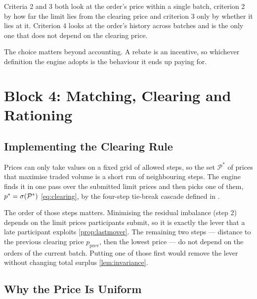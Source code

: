 Criteria 2 and 3 both look at the order's price within a single batch,
criterion 2 by how far the limit lies from the clearing price and
criterion 3 only by whether it lies at it. Criterion 4 looks at the
order's history across batches and is the only one that does not depend
on the clearing price.

The choice matters beyond accounting. A rebate is an incentive, so whichever
definition the engine adopts is the behaviour it ends up paying for.

\section{Block 4: Matching, Clearing and Rationing}
\label{sec:clearing}

\subsection{Implementing the Clearing Rule}

Prices can only take values on a fixed grid of allowed steps, so the set
$\mathcal{P}^{*}$ of prices that maximise traded volume is a short run of
neighbouring steps. The engine finds it in one pass over the submitted
limit prices and then picks one of them, $p^{\ast} = \sigma(\mathcal{P}^{*})$
\eqref{eq:clearing}, by the four-step tie-break cascade defined in
.

The order of those steps matters. Minimising the residual imbalance
(step 2) depends on the limit prices participants submit, so it is
exactly the lever that a late participant exploits \eqref{prop:lastmover}.
The remaining two steps --- distance to the previous clearing price
$p_{\mathrm{prev}}$, then the lowest price --- do not depend on the orders
of the current batch. Putting one of those first would remove the lever
without changing total surplus \eqref{lem:invariance}.

\subsection{Why the Price Is Uniform}

